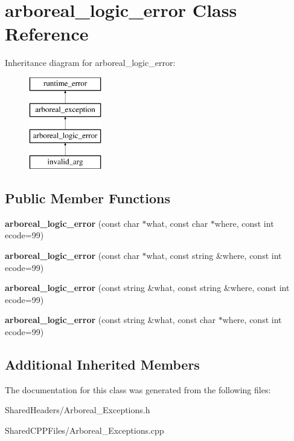 \hypertarget{classarboreal__logic__error}{}\section{arboreal\+\_\+logic\+\_\+error Class Reference}
\label{classarboreal__logic__error}
Inheritance diagram for arboreal\+\_\+logic\+\_\+error\+:\begin{figure}[H]
\begin{center}
\leavevmode
\includegraphics[height=4.000000cm]{d9/ddf/classarboreal__logic__error}
\end{center}
\end{figure}
\subsection*{Public Member Functions}
\begin{DoxyCompactItemize}
\item 
\mbox{\label{classarboreal__logic__error_aaea786c69fe107f9b6753b51001c59d6}} 
{\bfseries arboreal\+\_\+logic\+\_\+error} (const char $\ast$what, const char $\ast$where, const int ecode=99)
\item 
\mbox{\label{classarboreal__logic__error_a70b8217c9841efc9bb1e556282a89fe0}} 
{\bfseries arboreal\+\_\+logic\+\_\+error} (const char $\ast$what, const string \&where, const int ecode=99)
\item 
\mbox{\label{classarboreal__logic__error_ad7627c19a966b137cf018aa7c3075421}} 
{\bfseries arboreal\+\_\+logic\+\_\+error} (const string \&what, const string \&where, const int ecode=99)
\item 
\mbox{\label{classarboreal__logic__error_a5c589df18299902a24dae25f8a25c02a}} 
{\bfseries arboreal\+\_\+logic\+\_\+error} (const string \&what, const char $\ast$where, const int ecode=99)
\end{DoxyCompactItemize}
\subsection*{Additional Inherited Members}


The documentation for this class was generated from the following files\+:\begin{DoxyCompactItemize}
\item 
Shared\+Headers/Arboreal\+\_\+\+Exceptions.\+h\item 
Shared\+C\+P\+P\+Files/Arboreal\+\_\+\+Exceptions.\+cpp\end{DoxyCompactItemize}
